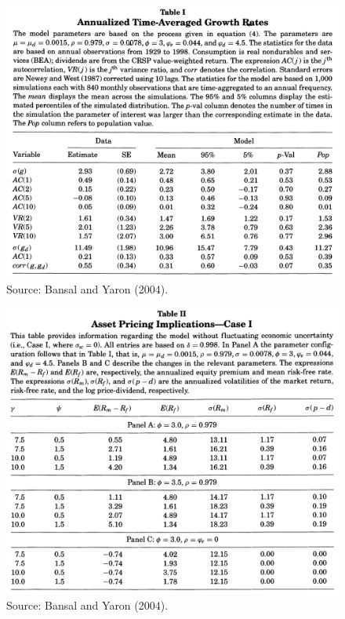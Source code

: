 \documentclass[
  12pt,
]{book}
\theoremstyle{definition}
\theoremstyle{definition}
\theoremstyle{definition}
\theoremstyle{definition}
\theoremstyle{remark}
\begin{document}
\begin{figure}

{\centering \includegraphics[width=1\linewidth]{figures/table_BY1} 

}

\caption{Source: Bansal and Yaron (2004).}\label{fig:BY1}
\end{figure}

\begin{figure}

{\centering \includegraphics[width=1\linewidth]{figures/table_BY2} 

}

\caption{Source: Bansal and Yaron (2004).}\label{fig:BY2}
\end{figure}
\end{document}
